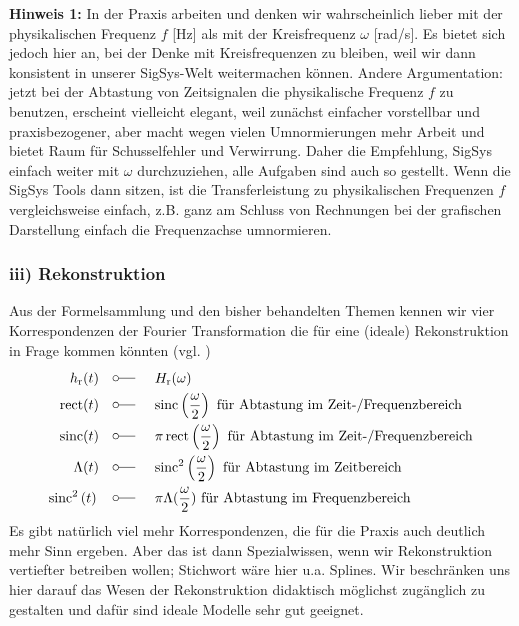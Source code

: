 \textbf{Hinweis 1:} In der Praxis arbeiten und denken wir wahrscheinlich
lieber mit der physikalischen
Frequenz $f$ [Hz] als mit der Kreisfrequenz $\omega$ [rad/s]. Es bietet sich jedoch hier an, bei der Denke
mit Kreisfrequenzen zu bleiben, weil wir dann konsistent in unserer SigSys-Welt
weitermachen können. Andere Argumentation: jetzt bei der Abtastung von Zeitsignalen
die physikalische Frequenz $f$ zu benutzen, erscheint vielleicht elegant,
weil zunächst einfacher vorstellbar und praxisbezogener,
aber macht wegen vielen Umnormierungen mehr Arbeit und bietet Raum für
Schusselfehler und Verwirrung.
Daher die Empfehlung, SigSys einfach weiter mit $\omega$ durchzuziehen,
alle Aufgaben sind auch so gestellt. Wenn die SigSys Tools dann sitzen, ist die
Transferleistung zu physikalischen Frequenzen $f$ vergleichsweise einfach, z.B.
ganz am Schluss von Rechnungen bei der grafischen Darstellung einfach die Frequenzachse umnormieren.


\subsubsection*{iii) Rekonstruktion}
Aus der Formelsammlung und den bisher behandelten Themen kennen wir vier
Korrespondenzen der Fourier Transformation die für eine (ideale) Rekonstruktion
in Frage kommen könnten (vgl. )
\begin{align}
h_\mathrm{r}(t) \quad\fourier\quad  & H_\mathrm{r}(\omega)\\
\text{rect}(t) \quad\fourier\quad  &\text{sinc}\left( \frac{\omega}{2} \right)\text{ für Abtastung im Zeit-/Frequenzbereich}\\
\text{sinc}(t)  \quad\fourier\quad  &\pi \,\text{rect}\left(\frac{\omega}{2}\right)\text{ für Abtastung im Zeit-/Frequenzbereich}\\
\Lambda(t) \quad\fourier\quad  &\text{sinc}^2\left( \frac{\omega}{2} \right)  \text{ für Abtastung im Zeitbereich}\\
\text{sinc}^2\left( t \right) \quad\fourier\quad  &\pi\Lambda(\frac{\omega}{2})\text{ für Abtastung im Frequenzbereich}
\end{align}
Es gibt natürlich viel mehr Korrespondenzen, die für die Praxis auch deutlich mehr
Sinn ergeben. Aber das ist dann Spezialwissen, wenn wir
Rekonstruktion vertiefter betreiben wollen; Stichwort wäre hier u.a. Splines.
Wir beschränken uns hier darauf das Wesen der Rekonstruktion didaktisch möglichst
zugänglich zu gestalten und dafür sind ideale Modelle sehr gut geeignet.

